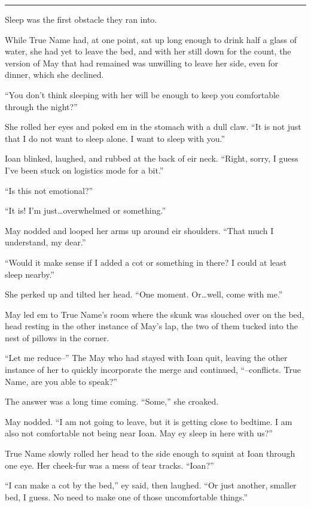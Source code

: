 \begin{center}\rule{0.5\linewidth}{0.5pt}\end{center}

Sleep was the first obstacle they ran into.

While True Name had, at one point, sat up long enough to drink half a glass of water, she had yet to leave the bed, and with her still down for the count, the version of May that had remained was unwilling to leave her side, even for dinner, which she declined.

``You don't think sleeping with her will be enough to keep you comfortable through the night?''

She rolled her eyes and poked em in the stomach with a dull claw. ``It is not just that I do not want to sleep alone. I want to sleep with you.''

Ioan blinked, laughed, and rubbed at the back of eir neck. ``Right, sorry, I guess I've been stuck on logistics mode for a bit.''

``Is this not emotional?''

``It is! I'm just\ldots overwhelmed or something.''

May nodded and looped her arms up around eir shoulders. ``That much I understand, my dear.''

``Would it make sense if I added a cot or something in there? I could at least sleep nearby.''

She perked up and tilted her head. ``One moment. Or\ldots well, come with me.''

May led em to True Name's room where the skunk was slouched over on the bed, head resting in the other instance of May's lap, the two of them tucked into the nest of pillows in the corner.

``Let me reduce--'' The May who had stayed with Ioan quit, leaving the other instance of her to quickly incorporate the merge and continued, ``--conflicts. True Name, are you able to speak?''

The answer was a long time coming. ``Some,'' she croaked.

May nodded. ``I am not going to leave, but it is getting close to bedtime. I am also not comfortable not being near Ioan. May ey sleep in here with us?''

True Name slowly rolled her head to the side enough to squint at Ioan through one eye. Her cheek-fur was a mess of tear tracks. ``Ioan?''

``I can make a cot by the bed,'' ey said, then laughed. ``Or just another, smaller bed, I guess. No need to make one of those uncomfortable things.''


